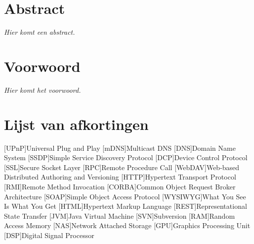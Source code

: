 %
%

\maketitle


%
%

\chapter*{Abstract}

\textit{Hier komt een abstract.}


%
%

\chapter*{Voorwoord}

\textit{Hier komt het voorwoord.}


%
%

\setlength\cftpartnumwidth{2em}

\newpage
\tableofcontents

\newpage


%
%

\listoffigures


%
%

\chapter*{Lijst van afkortingen}

\begin{acronym}[WYSIWYG]	%

[UPnP]{Universal Plug and Play}
[mDNS]{Multicast DNS}
[DNS]{Domain Name System}
[SSDP]{Simple Service Discovery Protocol}
[DCP]{Device Control Protocol}
[SSL]{Secure Socket Layer}
[RPC]{Remote Procedure Call}
[WebDAV]{Web-based Distributed Authoring and Versioning}
[HTTP]{Hypertext Transport Protocol}
[RMI]{Remote Method Invocation}
[CORBA]{Common Object Request Broker Architecture}
[SOAP]{Simple Object Access Protocol}
[WYSIWYG]{What You See Is What You Get}
[HTML]{Hypertext Markup Language}
[REST]{Representational State Transfer}
[JVM]{Java Virtual Machine}
[SVN]{Subversion}
[RAM]{Random Access Memory}
[NAS]{Network Attached Storage}
[GPU]{Graphics Processing Unit}
[DSP]{Digital Signal Processor}

\end{acronym}
